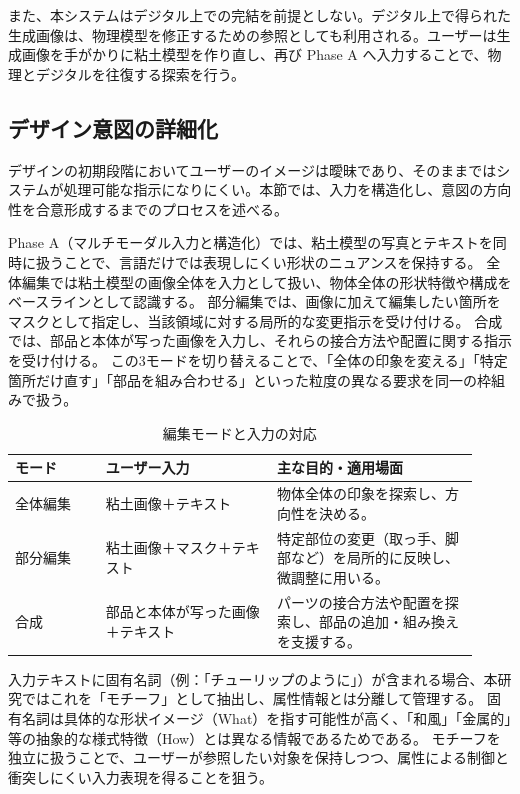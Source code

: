 \documentclass{kuisthesis}
\begin{document}
また、本システムはデジタル上での完結を前提としない。デジタル上で得られた生成画像は、物理模型を修正するための参照としても利用される。ユーザーは生成画像を手がかりに粘土模型を作り直し、再び Phase A へ入力することで、物理とデジタルを往復する探索を行う。

\subsection{デザイン意図の詳細化}
デザインの初期段階においてユーザーのイメージは曖昧であり、そのままではシステムが処理可能な指示になりにくい。本節では、入力を構造化し、意図の方向性を合意形成するまでのプロセスを述べる。

Phase A（マルチモーダル入力と構造化）では、粘土模型の写真とテキストを同時に扱うことで、言語だけでは表現しにくい形状のニュアンスを保持する。
全体編集では粘土模型の画像全体を入力として扱い、物体全体の形状特徴や構成をベースラインとして認識する。
部分編集では、画像に加えて編集したい箇所をマスクとして指定し、当該領域に対する局所的な変更指示を受け付ける。
合成では、部品と本体が写った画像を入力し、それらの接合方法や配置に関する指示を受け付ける。
この3モードを切り替えることで、「全体の印象を変える」「特定箇所だけ直す」「部品を組み合わせる」といった粒度の異なる要求を同一の枠組みで扱う。

\begin{table}[H]
  \centering
  \caption{編集モードと入力の対応}
  \label{tab:edit-modes}
  \begin{tabular}{|p{0.18\linewidth}|p{0.34\linewidth}|p{0.40\linewidth}|}
    \hline
    モード & ユーザー入力 & 主な目的・適用場面 \\
    \hline
    全体編集 & 粘土画像＋テキスト & 物体全体の印象を探索し、方向性を決める。 \\
    \hline
    部分編集 & 粘土画像＋マスク＋テキスト & 特定部位の変更（取っ手、脚部など）を局所的に反映し、微調整に用いる。 \\
    \hline
    合成 & 部品と本体が写った画像＋テキスト & パーツの接合方法や配置を探索し、部品の追加・組み換えを支援する。 \\
    \hline
  \end{tabular}
\end{table}

入力テキストに固有名詞（例：「チューリップのように」）が含まれる場合、本研究ではこれを「モチーフ」として抽出し、属性情報とは分離して管理する。
固有名詞は具体的な形状イメージ（What）を指す可能性が高く、「和風」「金属的」等の抽象的な様式特徴（How）とは異なる情報であるためである。
モチーフを独立に扱うことで、ユーザーが参照したい対象を保持しつつ、属性による制御と衝突しにくい入力表現を得ることを狙う。
\end{document}

